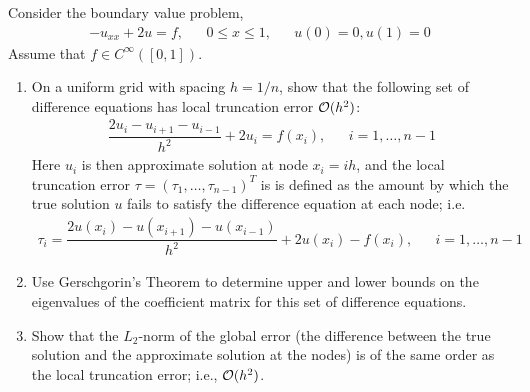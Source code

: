 \documentclass[10pt]{article}
\begin{document}
\begin{problem}
Consider the boundary value problem,
\begin{align*}
    -u_{xx} + 2u =f, &&0\leq x\leq 1,&& u(0) = 0, u(1)=0
\end{align*}
Assume that \( f\in C^\infty([0,1]) \).
\begin{enumerate}[label=(\alph*), nolistsep]
    \item On a uniform grid with spacing \( h = 1/n \), show that the following set of difference
equations has local truncation error \( \mathcal{O}(h^2) \):
\begin{align*}
    \dfrac{2u_i - u_{i+1} - u_{i-1}}{h^2} + 2u_i = f(x_i), && i = 1, \ldots, n-1
\end{align*}
Here \( u_i \) is then approximate solution at node \( x_i = ih \), and the local truncation error \( \tau = (\tau_1, \ldots, \tau_{n-1})^T \) is is defined as the amount by which the true solution \( u \) fails to satisfy the difference equation at each node; i.e.
\begin{align*}
    \tau_i = \dfrac{2u(x_i)-u(x_{i+1})-u(x_{i-1})}{h^2}+2u(x_i) - f(x_i), &&i=1, \ldots, n-1
\end{align*}
\item Use Gerschgorin’s Theorem to determine upper and lower bounds on the eigenvalues
of the coefficient matrix for this set of difference equations.
\item Show that the \( L_2\)-norm of the global error (the difference between the true solution
and the approximate solution at the nodes) is of the same order as the local truncation
error; i.e., \( \mathcal{O}(h^2)\).
\end{enumerate}
\end{problem}
\end{document}
